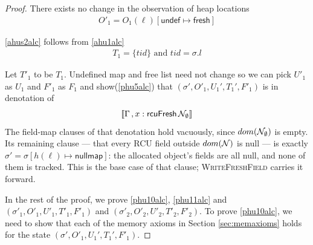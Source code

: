 \begin{proof}
There exists no change in the observation of heap locations
\begin{gather}\label{ahus1alc}
  O'_1 =  O_1(\ell)[\textsf{undef}\mapsto \textsf{fresh}]
\end{gather}

\ref{ahus2alc} follows from \ref{ahu1alc}
\begin{gather}\label{ahus2alc}
  T_1 = \{tid\} \text{ and } tid = \sigma.l
\end{gather}

Let $T'_1$ to be $T_1$. Undefined map and free list need not change so we can pick $U'_1$ as $U_1$ and $F'_1$ as $F_1$ and show(\ref{phu5alc}) that $(\sigma',O'_1,U_1',T_1',F'_1)$ is in denotation of
\[\llbracket \Gamma\,,  x:\textsf{rcuFresh} \, \mathcal{N}_{\emptyset}  \rrbracket \]
The field-map clauses of that denotation hold vacuously, since $dom(\mathcal{N}_{\emptyset})$
is empty.  Its remaining clause --- that every \textsf{RCU} field outside
$dom(\mathcal{N})$ is \textsf{null} --- is exactly $\sigma' = \sigma[h(\ell) \mapsto
\textsf{nullmap}]$: the allocated object's fields are all \textsf{null}, and none
of them is tracked.  This is the base case of that clause; \textsc{WriteFreshField}
carries it forward.

In the rest of the proof, we prove \ref{phu10alc}, \ref{phu11alc} and $(\sigma'_1, O'_1, U'_1,T'_1,F'_1)$ and  $(\sigma'_2, O'_2, U'_2,T'_2,F'_2)$. To prove \ref{phu10alc}, we need to show that each of the memory axioms in Section \ref{sec:memaxioms} holds for the state $(\sigma',O'_1,U_1',T_1',F'_1)$.


\end{proof}
